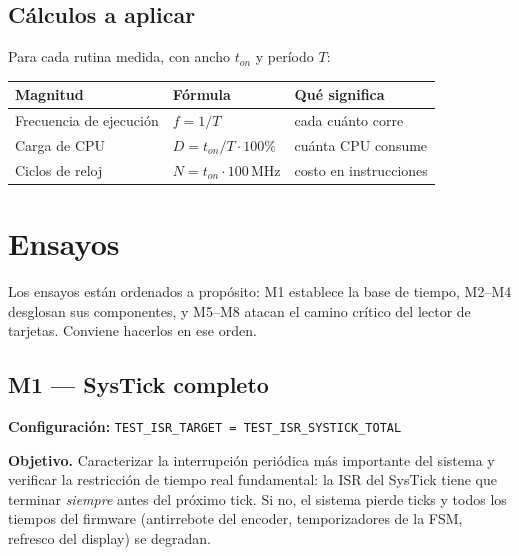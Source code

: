 \documentclass[11pt,a4paper]{article}
\begin{document}
\subsection{Cálculos a aplicar}

Para cada rutina medida, con ancho $t_{on}$ y período $T$:

\begin{center}
\begin{tabular}{@{}lll@{}}
\toprule
\textbf{Magnitud} & \textbf{Fórmula} & \textbf{Qué significa} \\
\midrule
Frecuencia de ejecución & $f = 1/T$              & cada cuánto corre \\
Carga de CPU            & $D = t_{on}/T \cdot 100\%$ & cuánta CPU consume \\
Ciclos de reloj         & $N = t_{on} \cdot 100\,\text{MHz}$ & costo en instrucciones \\
\bottomrule
\end{tabular}
\end{center}

\newpage
\section{Ensayos}

Los ensayos están ordenados a propósito: M1 establece la base de tiempo, M2--M4
desglosan sus componentes, y M5--M8 atacan el camino crítico del lector de
tarjetas. Conviene hacerlos en ese orden.

\subsection{M1 --- SysTick completo}

\textbf{Configuración:} \texttt{TEST\_ISR\_TARGET = TEST\_ISR\_SYSTICK\_TOTAL}

\textbf{Objetivo.} Caracterizar la interrupción periódica más importante del
sistema y verificar la restricción de tiempo real fundamental: la ISR del
SysTick tiene que terminar \emph{siempre} antes del próximo tick. Si no, el
sistema pierde ticks y todos los tiempos del firmware (antirrebote del
encoder, temporizadores de la FSM, refresco del display) se degradan.
\end{document}
